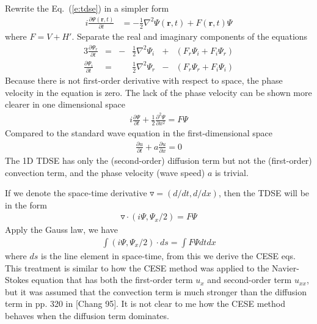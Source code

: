 \documentclass{isildur}
\begin{document}
Rewrite the Eq.~(\ref{e:tdse}) in a simpler form
%
\begin{align}
  i\frac{\partial \Psi(\mathbf{r}, t)}{\partial t}
    &= -\frac{1}{2}\nabla^2\Psi(\mathbf{r}, t) + F(\mathbf{r}, t)\Psi
    \label{e:tdse:simple}
\end{align}
%
where $F = V + H'$.  Separate the real and imaginary components of the
equations
\begin{alignat}{3}
  \frac{\partial \Psi_r}{\partial t} &=
  &-& \frac{1}{2} \nabla^2 \Psi_i &+& (F_r\Psi_i + F_i\Psi_r)
  \label{e:tdse:simple:r} \\
  \frac{\partial \Psi_i}{\partial t} &=
  & & \frac{1}{2} \nabla^2 \Psi_r &-& (F_r\Psi_r + F_i\Psi_i)
  \label{e:tdse:simple:i}
\end{alignat}
%
Because there is not first-order derivative with respect to space, the phase
velocity in the equation is zero.  The lack of the phase velocity can be shown
more clearer in one dimensional space
\begin{align}
  i\frac{\partial\Psi}{\partial t}
    + \frac{1}{2} \frac{\partial^2 \Psi}{\partial x^2}
    = F\Psi
\end{align}
Compared to the standard wave equation in the first-dimensional space
\begin{align}
  \frac{\partial u}{\partial t} + a\frac{\partial u}{\partial x} = 0
\end{align}
The 1D TDSE has only the (second-order) diffusion term but not the (first-order)
convection term, and the phase velocity (wave speed) $a$ is trivial.

If we denote the space-time derivative $\triangledown=(d/dt, d/dx)$, then the 
TDSE will be in the form
\begin{align*}
  \triangledown \cdot (i\Psi, \Psi_x/2)= F\Psi   
\end{align*}
Apply the Gauss law, we have
\begin{align*}
  \int (i\Psi, \Psi_x/2)\cdot ds=\int F\Psi dtdx
\end{align*}
where $ds$ is the line element in space-time, from this we derive the CESE eqs.
This treatment is similar to how the CESE method was applied to the Navier-Stokes
equation that has both the first-order term $u_x$ and second-order term $u_{xx}$,
but it was assumed that the convection term is much stronger than the diffusion
term in pp. 320 in [Chang 95].  It is not clear to me how the CESE method behaves
when the diffusion term dominates.

\clearpage
{}


\end{document}
